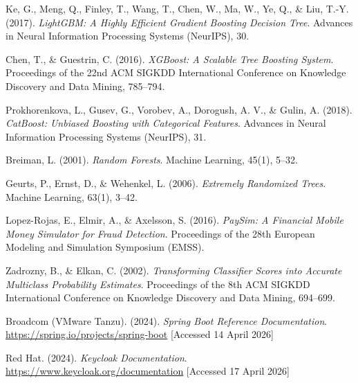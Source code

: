 \documentclass[12pt,a4paper]{report}
\begin{document}
\begin{enumerate}[label={[\arabic*]},leftmargin=1.6cm,itemsep=1.5pt,parsep=0pt,topsep=2pt]

  \item Ke, G., Meng, Q., Finley, T., Wang, T., Chen, W., Ma, W., Ye, Q., \& Liu, T.-Y.
        (2017). \textit{LightGBM: A Highly Efficient Gradient Boosting Decision Tree}.
        Advances in Neural Information Processing Systems (NeurIPS), 30.

  \item Chen, T., \& Guestrin, C. (2016). \textit{XGBoost: A Scalable Tree Boosting System}.
        Proceedings of the 22nd ACM SIGKDD International Conference on Knowledge Discovery
        and Data Mining, 785--794.

  \item Prokhorenkova, L., Gusev, G., Vorobev, A., Dorogush, A. V., \& Gulin, A. (2018).
        \textit{CatBoost: Unbiased Boosting with Categorical Features}. Advances in Neural
        Information Processing Systems (NeurIPS), 31.

  \item Breiman, L. (2001). \textit{Random Forests}. Machine Learning, 45(1), 5--32.

  \item Geurts, P., Ernst, D., \& Wehenkel, L. (2006). \textit{Extremely Randomized Trees}.
        Machine Learning, 63(1), 3--42.

  \item Lopez-Rojas, E., Elmir, A., \& Axelsson, S. (2016). \textit{PaySim: A Financial
        Mobile Money Simulator for Fraud Detection}. Proceedings of the 28th European
        Modeling and Simulation Symposium (EMSS).

  \item Zadrozny, B., \& Elkan, C. (2002). \textit{Transforming Classifier Scores into
        Accurate Multiclass Probability Estimates}. Proceedings of the 8th ACM SIGKDD
        International Conference on Knowledge Discovery and Data Mining, 694--699.

  \item Broadcom (VMware Tanzu). (2024). \textit{Spring Boot Reference Documentation}.
        \url{https://spring.io/projects/spring-boot} [Accessed 14 April 2026]

  \item Red Hat. (2024). \textit{Keycloak Documentation}.
        \url{https://www.keycloak.org/documentation} [Accessed 17 April 2026]


\end{enumerate}
\end{document}

